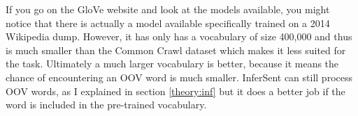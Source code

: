 If you go on the GloVe website and look at the models available, you might notice that there is actually a model available
specifically trained on a 2014 Wikipedia dump. However, it has only has a vocabulary of size 400,000 and thus is much smaller
than the Common Crawl dataset which makes it less suited for the task. Ultimately a much larger vocabulary is better,
because it means the chance of encountering an OOV word is much smaller. InferSent can still process OOV words, as I
explained in section \ref{theory:inf} but it does a better job if the word is included in the pre-trained vocabulary.
